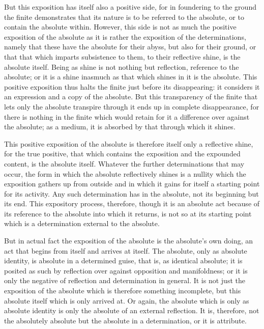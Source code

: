 But this exposition has itself also a positive side,
for in foundering to the ground the finite demonstrates
that its nature is to be referred to the absolute,
or to contain the absolute within.
However, this side is not as much
the positive exposition of the absolute
as it is rather the exposition of the determinations,
namely that these have the absolute for their abyss,
but also for their ground,
or that that which imparts subsistence to them,
to their reflective shine, is the absolute itself.
Being as shine is not nothing but reflection,
reference to the absolute;
or it is a shine inasmuch as
that which shines in it is the absolute.
This positive exposition thus halts the finite
just before its disappearing:
it considers it an expression and
a copy of the absolute.
But this transparency of the finite
that lets only the absolute transpire through it
ends up in complete disappearance,
for there is nothing in the finite
which would retain for it a difference
over against the absolute;
as a medium, it is absorbed by
that through which it shines.

This positive exposition of the absolute is
therefore itself only a reflective shine,
for the true positive, that which contains
the exposition and the expounded content,
is the absolute itself.
Whatever the further determinations that may occur,
the form in which the absolute reflectively shines is
a nullity which the exposition gathers up from outside
and in which it gains for itself 
a starting point for its activity.
Any such determination has in the absolute,
not its beginning but its end.
This expository process, therefore,
though it is an absolute act
because of its reference to 
the absolute into which it returns,
is not so at its starting point
which is a determination external to the absolute.

But in actual fact 
the exposition of the absolute 
is the absolute's own doing,
an act that begins from itself
and arrives at itself.
The absolute, only as absolute identity,
is absolute in a determined guise,
that is, as identical absolute;
it is posited as such by reflection
over against opposition and manifoldness;
or it is only the negative of
reflection and determination in general.
It is not just the exposition of the absolute
which is therefore something incomplete,
but this absolute itself which is only arrived at.
Or again, the absolute which is only as absolute identity is
only the absolute of an external reflection.
It is, therefore, not the absolutely absolute
but the absolute in a determination,
or it is attribute.

